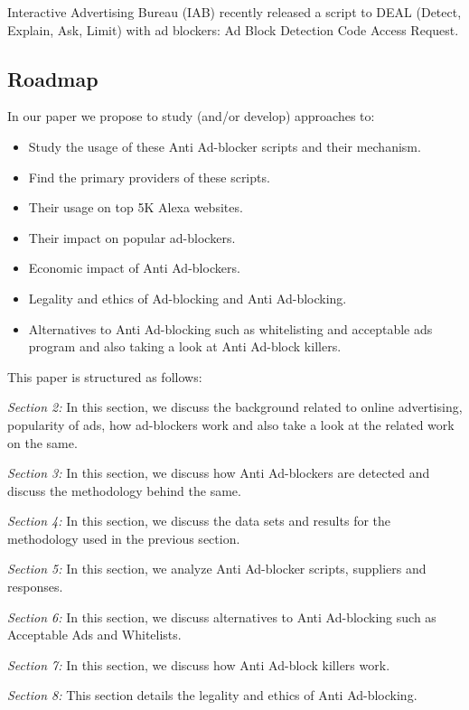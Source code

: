 \documentclass[runningheads,a4paper]{llncs}
\begin{document}
Interactive Advertising Bureau (IAB) recently released a script to DEAL (Detect, Explain, Ask, Limit) with ad blockers: Ad Block Detection Code Access Request.\cite{IAB2017}

\subsection{Roadmap}
In our paper we propose to study (and/or develop) approaches to:
\begin{itemize}
	\item Study the usage of these Anti Ad-blocker scripts and their mechanism.
	\item Find the primary providers of these scripts.
	\item Their usage on top 5K Alexa websites.\cite{Rishab2016}
	\item Their impact on popular ad-blockers.
	\item Economic impact of Anti Ad-blockers.\cite{TechCrunch2016}
	\item Legality and ethics of Ad-blocking and Anti Ad-blocking.
	\item Alternatives to Anti Ad-blocking such as whitelisting and acceptable ads program and also taking a look at Anti Ad-block killers.
    
\end{itemize}


This paper is structured as follows:

\textit{Section 2:} In this section, we discuss the background related to online advertising, popularity of ads, how ad-blockers work and also take a look at the related work on the same.

\textit{Section 3:} In this section, we discuss how Anti Ad-blockers are detected and discuss the methodology behind the same.

\textit{Section 4:} In this section, we discuss the data sets and results for the methodology used in the previous section.

\textit{Section 5:} In this section, we analyze Anti Ad-blocker scripts, suppliers and responses.

\textit{Section 6:} In this section, we discuss alternatives to Anti Ad-blocking such as Acceptable Ads and Whitelists.

\textit{Section 7:} In this section, we discuss how Anti Ad-block killers work.

\textit{Section 8:} This section details the legality and ethics of Anti Ad-blocking.
\end{document}
